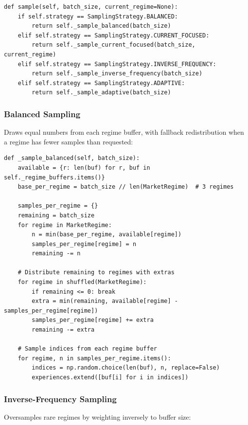 \documentclass[11pt,a4paper]{article}
\begin{document}
\begin{lstlisting}[caption={Main sampling dispatcher},label={lst:sample-dispatch}]
def sample(self, batch_size, current_regime=None):
    if self.strategy == SamplingStrategy.BALANCED:
        return self._sample_balanced(batch_size)
    elif self.strategy == SamplingStrategy.CURRENT_FOCUSED:
        return self._sample_current_focused(batch_size, current_regime)
    elif self.strategy == SamplingStrategy.INVERSE_FREQUENCY:
        return self._sample_inverse_frequency(batch_size)
    elif self.strategy == SamplingStrategy.ADAPTIVE:
        return self._sample_adaptive(batch_size)
\end{lstlisting}

\subsubsection{Balanced Sampling}
Draws equal numbers from each regime buffer, with fallback redistribution when a regime has fewer samples than requested:

\begin{lstlisting}[caption={Balanced sampling implementation},label={lst:balanced}]
def _sample_balanced(self, batch_size):
    available = {r: len(buf) for r, buf in self._regime_buffers.items()}
    base_per_regime = batch_size // len(MarketRegime)  # 3 regimes

    samples_per_regime = {}
    remaining = batch_size
    for regime in MarketRegime:
        n = min(base_per_regime, available[regime])
        samples_per_regime[regime] = n
        remaining -= n

    # Distribute remaining to regimes with extras
    for regime in shuffled(MarketRegime):
        if remaining <= 0: break
        extra = min(remaining, available[regime] - samples_per_regime[regime])
        samples_per_regime[regime] += extra
        remaining -= extra

    # Sample indices from each regime buffer
    for regime, n in samples_per_regime.items():
        indices = np.random.choice(len(buf), n, replace=False)
        experiences.extend([buf[i] for i in indices])
\end{lstlisting}

\subsubsection{Inverse-Frequency Sampling}
Oversamples rare regimes by weighting inversely to buffer size:
\end{document}
